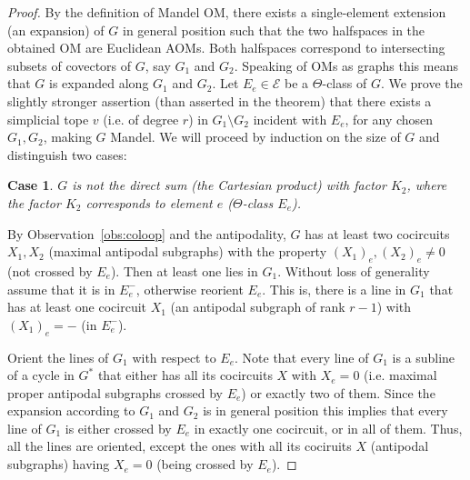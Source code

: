 \documentclass[final,11pt]{article}
\newtheorem{case}{Case}
\begin{document}
\begin{proof}
By the definition of Mandel OM, there exists a single-element extension (an expansion) of $G$ in general position such that the two halfspaces in the obtained OM are Euclidean AOMs. Both halfspaces correspond to intersecting subsets of covectors of $G$, say $G_1$ and $G_2$. Speaking of OMs as graphs this means that $G$ is expanded along $G_1$ and $G_2$. Let $E_e\in\mathcal{E}$ be a $\Theta$-class of $G$. We prove the slightly stronger assertion (than asserted in the theorem) that there exists a simplicial tope $v$ (i.e. of degree $r$) in $G_1 \setminus G_2$ incident with $E_e$, for any chosen $G_1,G_2$, making $G$ Mandel.
We will proceed by induction on the size of $G$ and distinguish two cases:

\begin{case}\label{case:noproduct}
 $G$ is not the direct sum (the Cartesian product) with factor $K_2$, where the factor $K_2$ corresponds to element $e$ ($\Theta$-class $E_e$).
\end{case} 


By Observation~\ref{obs:coloop} and the antipodality, $G$ has at least two cocircuits $X_1,X_2$ (maximal antipodal subgraphs) with the property $(X_1)_e,(X_2)_e \neq 0$ (not crossed by $E_e$).  Then at least one lies in $G_1$. Without loss of generality assume that it is in $E_e^-$, otherwise reorient $E_e$. This is, there is a
line in $G_1$ that has at least one cocircuit $X_1$ (an antipodal subgraph of rank $r-1$) with $(X_1)_e = -$ (in $E_e^-$).


Orient the lines of $G_1$ with respect to $E_e$. Note that every line of $G_1$ is a subline of a cycle in $G^*$ that either has all its cocircuits $X$ with $X_e=0$ (i.e. maximal proper antipodal subgraphs crossed by $E_e$) or exactly two of them. Since the expansion according to $G_1$ and $G_2$ is in general position this implies that every line of $G_1$ is either crossed by $E_e$ in exactly one cocircuit, or in all of them. Thus, all the lines are oriented, except the ones with all its cociruits $X$ (antipodal subgraphs) having $X_e=0$ (being crossed by $E_e$).



\end{proof}
\end{document}
